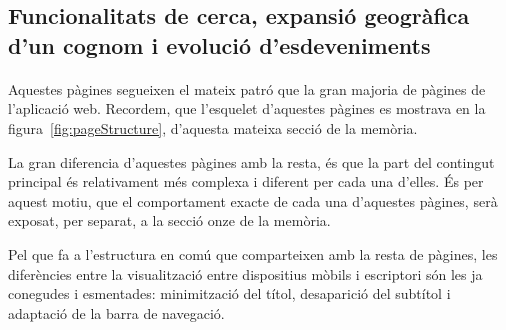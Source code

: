 \subsection{Funcionalitats de cerca, expansió geogràfica d'un cognom i evolució d'esdeveniments}

    \paragraph{}
    Aquestes pàgines segueixen el mateix patró que la gran majoria de pàgines de l’aplicació web. Recordem, que l'esquelet d’aquestes pàgines es mostrava en la figura~\ref{fig:pageStructure}, d'aquesta mateixa secció de la memòria.

    La gran diferencia d'aquestes pàgines amb la resta, és que la part del contingut principal és relativament més complexa i diferent per cada una d'elles. És per aquest motiu, que el comportament exacte de cada una d'aquestes pàgines, serà exposat, per separat, a la secció onze de la memòria.

    Pel que fa a l'estructura en comú que comparteixen amb la resta de pàgines, les diferències entre la visualització entre dispositius mòbils i escriptori són les ja conegudes i esmentades: minimització del títol, desaparició del subtítol i adaptació de la barra de navegació.
